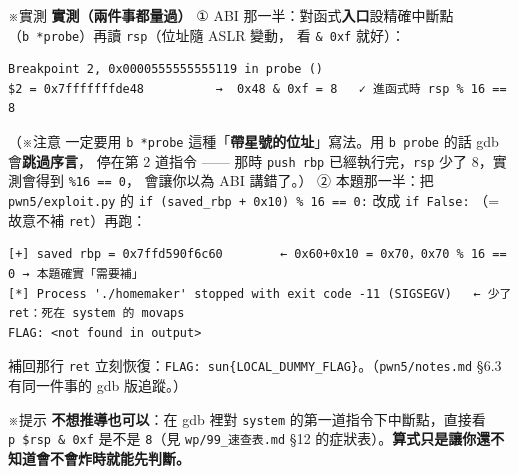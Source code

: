 \documentclass[10pt,a4paper]{article}
\renewenvironment{quote}{%
  \begin{mdframed}[linewidth=0pt,innerleftmargin=0pt,innerrightmargin=0pt,
    innerbottommargin=0pt,innertopmargin=0pt,skipabove=0.55em,skipbelow=0.55em,
    leftmargin=0.9em,rightmargin=0.4em,startcode={\color{quotebar}\vrule width 2.6pt},%
    endcode={}]%
  \itshape\color{black}%
}{%
  \end{mdframed}%
}
\begin{document}
\begin{quote}
※實測 \textbf{實測（兩件事都量過）} ① ABI
那一半：對函式\textbf{入口}設精確中斷點（\texttt{b\ \allowbreak{}*probe}）再讀
\texttt{rsp}（位址隨 ASLR 變動， 看 \texttt{\&\allowbreak{}\ \allowbreak{}0xf} 就好）：

\begin{Verbatim}[breaklines=true,breakanywhere=true,breakautoindent=false,fontsize=\fontsize{7.0}{9.5}\selectfont]
Breakpoint 2, 0x0000555555555119 in probe ()
$2 = 0x7fffffffde48          →  0x48 & 0xf = 8   ✓ 進函式時 rsp % 16 == 8
\end{Verbatim}

（※注意 一定要用 \texttt{b\ \allowbreak{}*probe}
這種「\textbf{帶星號的位址}」寫法。用 \texttt{b\ \allowbreak{}probe} 的話 gdb
會\textbf{跳過序言}， 停在第 2 道指令 ------ 那時 \texttt{push\ \allowbreak{}rbp}
已經執行完，\texttt{rsp} 少了 8，實測會得到 \texttt{\%\allowbreak{}16\ \allowbreak{}==\ \allowbreak{}0}，
會讓你以為 ABI 講錯了。） ② 本題那一半：把 \texttt{pwn5/\allowbreak{}exploit.\allowbreak{}py} 的
\texttt{if\ \allowbreak{}(saved\_\allowbreak{}rbp\ \allowbreak{}+\ \allowbreak{}0x10)\ \allowbreak{}\%\allowbreak{}\ \allowbreak{}16\ \allowbreak{}==\ \allowbreak{}0:} 改成
\texttt{if\ \allowbreak{}False:} （= 故意不補 \texttt{ret}）再跑：

\begin{Verbatim}[breaklines=true,breakanywhere=true,breakautoindent=false,fontsize=\fontsize{7.0}{9.5}\selectfont]
[+] saved rbp = 0x7ffd590f6c60        ← 0x60+0x10 = 0x70，0x70 % 16 == 0 → 本題確實「需要補」
[*] Process './homemaker' stopped with exit code -11 (SIGSEGV)   ← 少了 ret：死在 system 的 movaps
FLAG: <not found in output>
\end{Verbatim}

補回那行 \texttt{ret}
立刻恢復：\texttt{FLAG:\allowbreak{}\ \allowbreak{}sun\{\allowbreak{}LOCAL\_\allowbreak{}DUMMY\_\allowbreak{}FLAG\}\allowbreak{}}。（\texttt{pwn5/\allowbreak{}notes.\allowbreak{}md}
§6.3 有同一件事的 gdb 版追蹤。）
\end{quote}

\begin{quote}
※提示 \textbf{不想推導也可以}：在 gdb 裡對 \texttt{system}
的第一道指令下中斷點，直接看 \texttt{p\ \allowbreak{}\$\allowbreak{}rsp\ \allowbreak{}\&\allowbreak{}\ \allowbreak{}0xf} 是不是
\texttt{8}（見 \texttt{wp/\allowbreak{}99\_\allowbreak{}速查表.\allowbreak{}md} §12
的症狀表）。\textbf{算式只是讓你還不知道會不會炸時就能先判斷。}
\end{quote}
\end{document}
